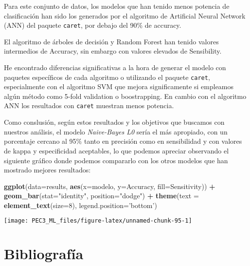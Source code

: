 \documentclass[
]{article}
\newenvironment{Shaded}{\begin{snugshade}}{\end{snugshade}}
\newcommand{\DataTypeTok}[1]{\textcolor[rgb]{0.13,0.29,0.53}{#1}}
\newcommand{\DecValTok}[1]{\textcolor[rgb]{0.00,0.00,0.81}{#1}}
\newcommand{\KeywordTok}[1]{\textcolor[rgb]{0.13,0.29,0.53}{\textbf{#1}}}
\newcommand{\NormalTok}[1]{#1}
\newcommand{\OperatorTok}[1]{\textcolor[rgb]{0.81,0.36,0.00}{\textbf{#1}}}
\newcommand{\StringTok}[1]{\textcolor[rgb]{0.31,0.60,0.02}{#1}}
\begin{document}
Para este conjunto de datos, los modelos que han tenido menos potencia
de clasificación han sido los generados por el algoritmo de Artificial
Neural Network (ANN) del paquete \texttt{caret}, por debajo del 90\% de
accuracy.

El algoritmo de árboles de decisión y Random Forest han tenido valores
intermedios de Accuracy, sin embargo con valores elevados de
Sensibility.

He encontrado diferencias significativas a la hora de generar el modelo
con paquetes específicos de cada algoritmo o utilizando el paquete
\texttt{caret}, especialmente con el algoritmo SVM que mejora
significamente si empleamos algún método como 5-fold validation o
boostrapping. En cambio con el algoritmo ANN los resultados con
\texttt{caret} muestran menos potencia.

Como conslusión, según estos resultados y los objetivos que buscamos con
nuestros análisis, el modelo \emph{Naive-Bayes L0} sería el más
apropiado, con un porcentaje cercano al 95\% tanto en precisión como en
sensibilidad y con valores de kappa y especificidad aceptables, lo que
podemos apreciar observando el siguiente gráfico donde podemos
compararlo con los otros modelos que han mostrado mejores resultados:

\begin{Shaded}
\begin{Highlighting}[]
\KeywordTok{ggplot}\NormalTok{(}\DataTypeTok{data=}\NormalTok{results, }\KeywordTok{aes}\NormalTok{(}\DataTypeTok{x=}\NormalTok{modelo, }\DataTypeTok{y=}\NormalTok{Accuracy, }\DataTypeTok{fill=}\NormalTok{Sensitivity)) }\OperatorTok{+}\StringTok{ }
\StringTok{    }\KeywordTok{geom_bar}\NormalTok{(}\DataTypeTok{stat=}\StringTok{"identity"}\NormalTok{, }\DataTypeTok{position=}\StringTok{"dodge"}\NormalTok{) }\OperatorTok{+}\StringTok{  }\KeywordTok{theme}\NormalTok{(}\DataTypeTok{text =} \KeywordTok{element_text}\NormalTok{(}\DataTypeTok{size=}\DecValTok{8}\NormalTok{),}
                                                         \DataTypeTok{legend.position=}\StringTok{'bottom'}\NormalTok{) }
\end{Highlighting}
\end{Shaded}

\begin{center}\texttt{[image: PEC3\_ML\_files/figure-latex/unnamed-chunk-95-1]} \end{center}

\hypertarget{bibliografuxeda}{%
\section*{Bibliografía}\label{bibliografuxeda}}
\end{document}
